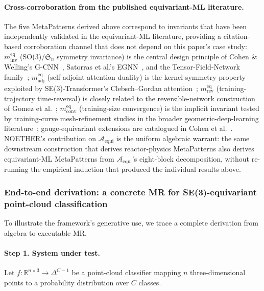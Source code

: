 \documentclass[acmsmall, screen]{acmart}
\begin{document}
\paragraph{Cross-corroboration from the published equivariant-ML literature.}
The five MetaPatterns derived above correspond to invariants that have been independently validated in the equivariant-ML literature, providing a citation-based corroboration channel that does not depend on this paper's case study: $m^{\mathrm{eq}}_{\mathrm{inv}}$ (SO(3)/$\mathfrak{S}_n$ symmetry invariance) is the central design principle of Cohen \& Welling's G-CNN~\cite{CohenWelling2016}, Satorras et al.'s EGNN~\cite{Satorras2021EGNN}, and the Tensor-Field-Network family~\cite{ThomasSmidt2018}; $m^{\mathrm{eq}}_{\mathrm{adj}}$ (self-adjoint attention duality) is the kernel-symmetry property exploited by SE(3)-Transformer's Clebsch--Gordan attention~\cite{FuchsTransformer2020}; $m^{\mathrm{eq}}_{\mathrm{rev}}$ (training-trajectory time-reversal) is closely related to the reversible-network construction of Gomez et al.~\cite{Gomez2017Reversible}; $m^{\mathrm{eq}}_{\mathrm{conv}}$ (training-size convergence) is the implicit invariant tested by training-curve mesh-refinement studies in the broader geometric-deep-learning literature~\cite{Bronstein2021GDL}; gauge-equivariant extensions are catalogued in Cohen et al.~\cite{Cohen2019Gauge}. NOETHER's contribution on $\mathcal{A}_{\mathrm{equi}}$ is the uniform algebraic warrant: the same downstream construction that derives reactor-physics MetaPatterns also derives equivariant-ML MetaPatterns from $\mathcal{A}_{\mathrm{equi}}$'s eight-block decomposition, without re-running the empirical induction that produced the individual results above.

\subsubsection{End-to-end derivation: a concrete MR for SE(3)-equivariant point-cloud classification}
\label{subsec:rho-rot}
\label{subsec:end-to-end}

To illustrate the framework's generative use, we trace a complete derivation from algebra to executable MR.

\paragraph{Step 1. System under test.} Let $f: \mathbb{R}^{n\times 3} \to \Delta^{C-1}$ be a point-cloud classifier mapping $n$ three-dimensional points to a probability distribution over $C$ classes.
\end{document}
